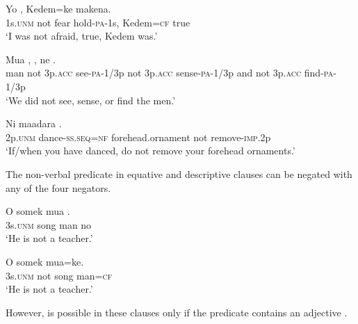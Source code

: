 \ea%
\label{ex:6:x1091}
\gll Yo      ,  Kedem=ke  makena. \\
1s.\textsc{unm}  not  fear  hold-\textsc{pa}-1s,  Kedem=\textsc{cf}  true\\
\glt `I was not afraid, true, Kedem was.'
\z

\ea%
\label{ex:6:x1092}
\gll Mua      ,      , ne      .\\
man  not  3p.\textsc{acc}  see-\textsc{pa}-1/3p  not  3p.\textsc{acc}  sense-\textsc{pa}-1/3p and  not  3p.\textsc{acc}  find-\textsc{pa}-1/3p\\
\glt `We did not see, sense, or find the men.'
\z

\ea%
\label{ex:6:x1113}
\gll Ni   maadara    . \\
2p.\textsc{unm}  dance-\textsc{ss}.\textsc{seq}=\textsc{nf}  forehead.ornament  not  remove-\textsc{imp}.2p\\
\glt `If/when you have danced, do not remove your forehead ornaments.'
\z

The non-verbal predicate in equative  and descriptive clauses  can be negated with any of the four negators. 

\ea%
\label{ex:6:x1093}
\gll O  somek  mua  . \\
3s.\textsc{unm}  song  man  no\\
\glt `He is not a teacher.'
\z

\ea%
\label{ex:6:x1095}
\gll O    somek  mua=ke. \\
3s.\textsc{unm}  not  song  man=\textsc{cf}\\
\glt `He is not a teacher.' 
\z

However,  is possible in these clauses only if the predicate contains an adjective .

